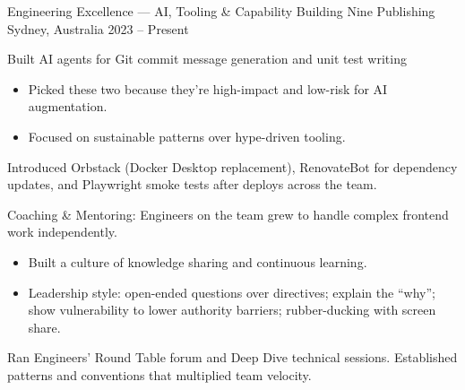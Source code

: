 \begin{cventries}
  \cventry
    {Engineering Excellence --- AI, Tooling \& Capability Building} %
    {Nine Publishing} %
    {Sydney, Australia} %
    {2023 -- Present} %
    {
      \begin{cvitems}
        \item {Built AI agents for Git commit message generation and unit test writing}
            \begin{itemize}
                \item {Picked these two because they're high-impact and low-risk for AI augmentation.}
                \item {Focused on sustainable patterns over hype-driven tooling.}
            \end{itemize}
        \item {Introduced Orbstack (Docker Desktop replacement), RenovateBot for dependency updates, and Playwright smoke tests after deploys across the team.}
        \item {Coaching \& Mentoring: Engineers on the team grew to handle complex frontend work independently.}
            \begin{itemize}
                \item {Built a culture of knowledge sharing and continuous learning.}
                \item {Leadership style: open-ended questions over directives; explain the ``why''; show vulnerability to lower authority barriers; rubber-ducking with screen share.}
            \end{itemize}
        \item {Ran Engineers' Round Table forum and Deep Dive technical sessions. Established patterns and conventions that multiplied team velocity.}
      \end{cvitems}
    }

\end{cventries}

